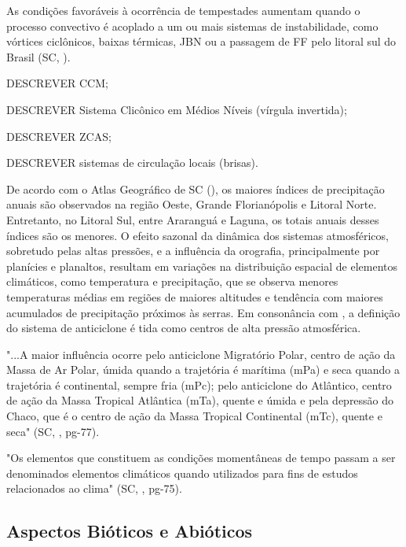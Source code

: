 \indent As condições favoráveis à ocorrência de tempestades aumentam quando o processo convectivo é acoplado a um ou mais sistemas de instabilidade, como vórtices ciclônicos, baixas térmicas, \acrfull{JBN} ou a passagem de \acrlong{FF} pelo litoral sul do Brasil (\acrlong{SC}, \citeyear{AtlasSCnatureza}).

DESCREVER \acrlong{CCM};

DESCREVER Sistema Clicônico em Médios Níveis (vírgula invertida);

DESCREVER \acrlong{ZCAS};

DESCREVER  sistemas de circulação locais (brisas).

\indent De acordo com o Atlas Geográfico de \acrlong{SC} (\citeyear{AtlasSCnatureza}), os maiores índices de precipitação anuais são observados na região Oeste, Grande Florianópolis e Litoral Norte. Entretanto, no Litoral Sul, entre Araranguá e Laguna, os totais anuais desses índices são os menores. O efeito sazonal da dinâmica dos sistemas atmosféricos, sobretudo pelas altas pressões, e a influência da orografia, principalmente por planícies e planaltos, resultam em variações na distribuição espacial de elementos climáticos, como temperatura e precipitação, que se observa menores temperaturas médias em regiões de maiores altitudes e tendência com maiores acumulados de precipitação próximos às serras. Em consonância com , a definição do sistema de anticiclone é tida como centros de alta pressão atmosférica.

\begin{citacao}
"...A maior influência ocorre pelo anticiclone Migratório Polar, centro de ação da Massa de Ar Polar, úmida quando a trajetória é marítima (mPa) e seca quando a trajetória é continental, sempre fria (mPc); pelo anticiclone do Atlântico, centro de ação da Massa Tropical Atlântica (mTa), quente e úmida e pela depressão do Chaco, que é o centro de ação da Massa Tropical Continental (mTc), quente e seca" (\acrlong{SC}, \citeyear{AtlasSCnatureza}, pg-77).
\end{citacao}

\indent "Os elementos que constituem as condições momentâneas de tempo passam a ser denominados elementos climáticos quando utilizados para fins de estudos relacionados ao clima" (\acrlong{SC}, \citeyear{AtlasSCnatureza}, pg-75).

\subsection{Aspectos Bióticos e Abióticos}

